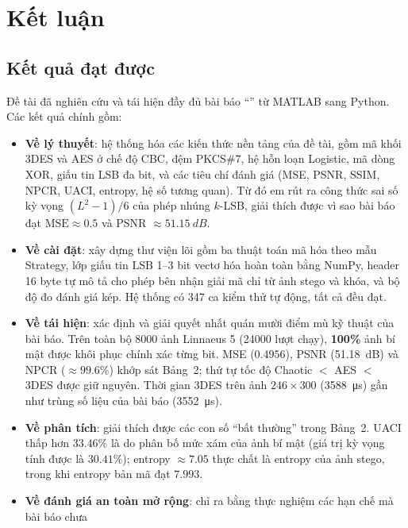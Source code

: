 \chapter{Kết luận}
\label{chap:ketluan}

\section{Kết quả đạt được}

Đề tài đã nghiên cứu và tái hiện đầy đủ bài báo ``\BaiBaoGoc'' \cite{raut2026hybrid} từ MATLAB sang
Python. Các kết quả chính gồm:
\begin{itemize}
  \item \textbf{Về lý thuyết}: hệ thống hóa các kiến thức nền tảng của đề tài, gồm mã khối 3DES và
        AES ở chế độ CBC, đệm PKCS\#7, hệ hỗn loạn Logistic, mã dòng XOR, giấu tin LSB đa bit, và các
        tiêu chí đánh giá (MSE, PSNR, SSIM, NPCR, UACI, entropy, hệ số tương quan). Từ đó em rút ra
        công thức sai số kỳ vọng $(L^2-1)/6$ của phép nhúng $k$-LSB, giải thích được vì sao bài báo
        đạt $\mathrm{MSE} \approx 0.5$ và PSNR $\approx \SI{51.15}{dB}$.
  \item \textbf{Về cài đặt}: xây dựng thư viện lõi gồm ba thuật toán mã hóa theo mẫu Strategy, lớp
        giấu tin LSB 1--3 bit vectơ hóa hoàn toàn bằng NumPy, header 16 byte tự mô tả cho phép bên
        nhận giải mã chỉ từ ảnh stego và khóa, và bộ độ đo đánh giá kép. Hệ thống có 347 ca kiểm thử
        tự động, tất cả đều đạt.
  \item \textbf{Về tái hiện}: xác định và giải quyết nhất quán mười điểm mù kỹ thuật của bài báo.
        Trên toàn bộ 8000 ảnh Linnaeus 5 (\num{24000} lượt chạy), \textbf{100\%} ảnh bí mật được khôi
        phục chính xác từng bit. MSE ($0.4956$), PSNR (\SI{51.18}{dB}) và NPCR ($\approx 99.6\%$) khớp
        sát Bảng~2; thứ tự tốc độ Chaotic $<$ AES $<$ 3DES được giữ nguyên. Thời gian 3DES trên ảnh
        $246\times300$ (\SI{3588}{\micro s}) gần như trùng số liệu của bài báo (\SI{3552}{\micro s}).
  \item \textbf{Về phân tích}: giải thích được các con số ``bất thường'' trong Bảng~2. UACI thấp hơn
        $33.46\%$ là do phân bố mức xám của ảnh bí mật (giá trị kỳ vọng tính được là $30.41\%$);
        entropy $\approx 7.05$ thực chất là entropy của ảnh stego, trong khi entropy bản mã đạt
        $7.993$.
  \item \textbf{Về đánh giá an toàn mở rộng}: chỉ ra bằng thực nghiệm các hạn chế mà bài báo chưa

\end{itemize}
